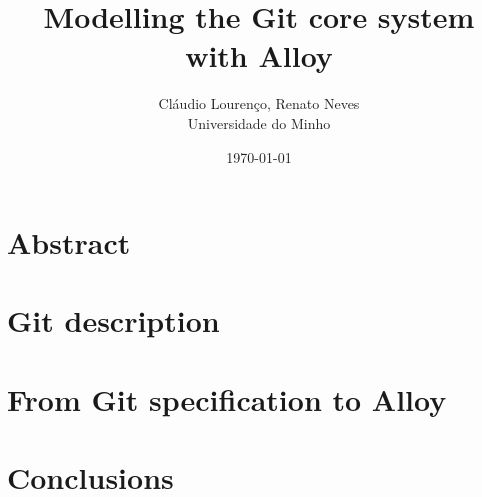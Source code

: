 \documentclass[a4paper,11pt]{article}
\begin{document}
\title{ Modelling the Git core system with Alloy }

\author{Cláudio Lourenço, Renato Neves \\ Universidade do Minho}
\date{\today}
\maketitle
\pagebreak


\section{Abstract}

\section{Git description}

\section{From Git specification to Alloy}


\section{Conclusions}


\begin{thebibliography}{4}

\end{thebibliography}
\end{document}
